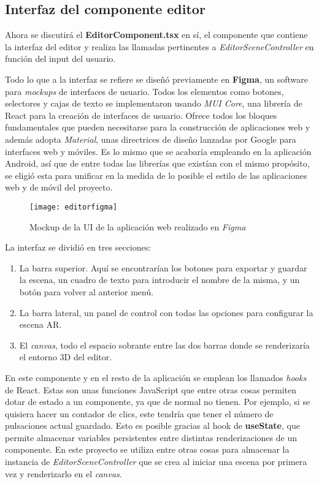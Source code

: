 \subsection{Interfaz del componente editor}

Ahora se discutirá el \textbf{EditorComponent.tsx} en sí, el componente que contiene la interfaz del editor y realiza las llamadas pertinentes a \textit{EditorSceneController} en función del input del usuario.

Todo lo que a la interfaz se refiere se diseñó previamente en \textbf{Figma}\cite{figma}, un software para \textit{mockups} de interfaces de usuario. Todos los elementos como botones, selectores y cajas de texto se implementaron usando \textit{MUI Core}, una librería de React para la creación de interfaces de usuario. Ofrece todos los bloques fundamentales que pueden necesitarse para la construcción de aplicaciones web y además adopta \textit{Material}, unas directrices de diseño lanzadas por Google para interfaces web y móviles. Es lo mismo que se acabaría empleando en la aplicación Android, así que de entre todas las librerías que existían con el mismo propósito, se eligió esta para unificar en la medida de lo posible el estilo de las aplicaciones web y de móvil del proyecto.

\begin{figure}[h]
    \centering
    \texttt{[image: editorfigma]}
    \caption[Mockup de la UI de la aplicación web]{Mockup de la UI de la aplicación web realizado en \textit{Figma}}
\end{figure}

La interfaz se dividió en tres secciones:

\begin{enumerate}
    \item La barra superior. Aquí se encontrarían los botones para exportar y guardar la escena, un cuadro de texto para introducir el nombre de la misma, y un botón para volver al anterior menú.
    \item La barra lateral, un panel de control con todas las opciones para configurar la escena AR.
    \item El \textit{canvas}, todo el espacio sobrante entre las dos barras donde se renderizaría el entorno 3D del editor.
\end{enumerate}

En este componente y en el resto de la aplicación se emplean los llamados \textit{hooks} de React. Estas son unas funciones JavaScript que entre otras cosas permiten dotar de estado a un componente, ya que de normal no tienen. Por ejemplo, si se quisiera hacer un contador de clics, este tendría que tener el número de pulsaciones actual guardado. Esto es posible gracias al hook de \textbf{useState}, que permite almacenar variables persistentes entre distintas renderizaciones de un componente. En este proyecto se utiliza entre otras cosas para almacenar la instancia de \textit{EditorSceneController} que se crea al iniciar una escena por primera vez y renderizarlo en el \textit{canvas}.

